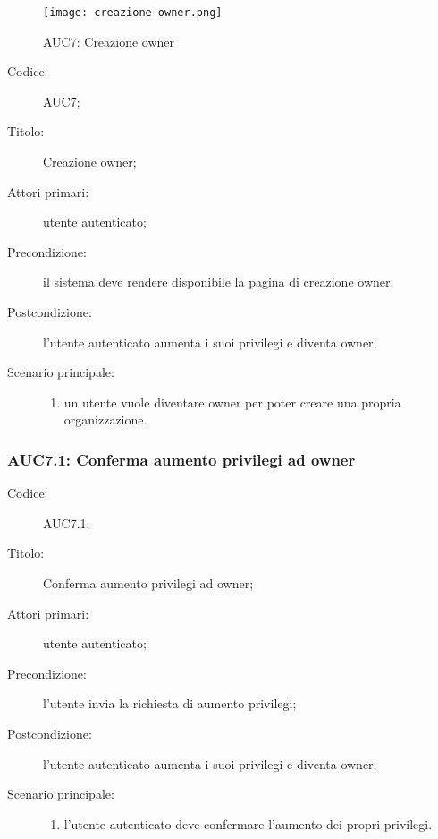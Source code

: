 \documentclass[../../../analisi-dei-requisiti.tex]{subfiles}
\begin{document}
\begin{figure}[H]
  \centering
  \texttt{[image: creazione-owner.png]}
  \caption{AUC7: Creazione owner}%
  \label{fig:AUC7}
\end{figure}

\begin{description}
  \item[Codice:] AUC7;
  \item[Titolo:] Creazione owner;
  \item[Attori primari:] utente autenticato;
  \item[Precondizione:] il sistema deve rendere disponibile la pagina di creazione owner;
  \item[Postcondizione:] l'utente autenticato aumenta i suoi privilegi e diventa owner;
  \item[Scenario principale:]
  \begin{enumerate}
    \item un utente vuole diventare owner per poter creare una propria organizzazione.
  \end{enumerate}
\end{description}

\subsubsection{AUC7.1: Conferma aumento privilegi ad owner}%
\label{subs:AUC7.1}
\begin{description}
  \item[Codice:] AUC7.1;
  \item[Titolo:] Conferma aumento privilegi ad owner;
  \item[Attori primari:] utente autenticato;
  \item[Precondizione:] l'utente invia la richiesta di aumento privilegi;
  \item[Postcondizione:] l'utente autenticato aumenta i suoi privilegi e diventa owner;
  \item[Scenario principale:]
  \begin{enumerate}
    \item l'utente autenticato deve confermare l'aumento dei propri privilegi.
  \end{enumerate}
\end{description}
\end{document}
